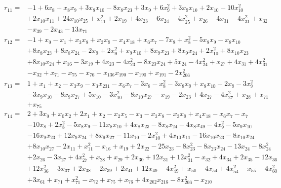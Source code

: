 \[\begin{aligned}
r_{11}={}&-1+6x_{8}+x_{8}x_{9}+3x_{8}x_{10}-8x_{8}x_{23}+3x_{9}+6x_{9}^{2}+3x_{9}x_{10}+2x_{10}-10x_{10}^{2}
\\ &+2x_{10}x_{11}+24x_{10}x_{25}+x_{11}^{2}+2x_{19}+4x_{23}-6x_{24}-4x_{25}^{2}+x_{26}-4x_{31}-4x_{31}^{2}+x_{32}
\\ &-x_{39}-2x_{43}-13x_{71}
\end{aligned}\]
\[\begin{aligned}
r_{12}={}&-1+x_{0}-x_{1}+x_{3}x_{8}+x_{3}x_{9}-x_{4}x_{18}+x_{6}x_{7}-7x_{8}+x_{8}^{2}-5x_{8}x_{9}-x_{8}x_{10}
\\ &+8x_{8}x_{23}+8x_{8}x_{24}-2x_{9}+2x_{9}^{2}+x_{9}x_{10}+8x_{9}x_{23}+8x_{9}x_{24}+2x_{10}^{2}+8x_{10}x_{23}
\\ &+8x_{10}x_{24}+x_{16}-3x_{19}+4x_{23}-4x_{23}^{2}-8x_{23}x_{24}+5x_{24}-4x_{24}^{2}+x_{27}+4x_{31}+4x_{31}^{2}
\\ &-x_{32}+x_{71}-x_{75}-x_{76}-x_{136}x_{190}-x_{190}+x_{191}-2x_{206}^{2}
\end{aligned}\]
\[\begin{aligned}
r_{13}={}&1+x_{1}+x_{2}-x_{3}x_{9}-x_{3}x_{231}-x_{6}x_{7}-3x_{8}-x_{8}^{2}-3x_{8}x_{9}+x_{8}x_{10}+2x_{9}-3x_{9}^{2}
\\ &-3x_{9}x_{10}-8x_{9}x_{27}+5x_{10}-3x_{10}^{2}-8x_{10}x_{27}-x_{19}-2x_{23}+4x_{27}-4x_{27}^{2}+x_{28}+x_{71}
\\ &+x_{75}
\end{aligned}\]
\[\begin{aligned}
r_{14}={}&2+3x_{0}+x_{0}x_{2}+2x_{1}+x_{2}-x_{2}x_{5}-x_{3}-x_{3}x_{8}-x_{3}x_{9}+x_{4}x_{18}-x_{6}x_{7}-x_{7}
\\ &-10x_{8}+2x_{8}^{2}-5x_{8}x_{9}-11x_{8}x_{10}+4x_{8}x_{23}-8x_{8}x_{24}-4x_{8}x_{49}-4x_{9}^{2}-5x_{9}x_{10}
\\ &-16x_{9}x_{23}+12x_{9}x_{24}+8x_{9}x_{27}-11x_{10}-2x_{10}^{2}+4x_{10}x_{11}-16x_{10}x_{23}-8x_{10}x_{24}
\\ &+8x_{10}x_{27}-2x_{11}+x_{11}^{2}-x_{16}+x_{19}+2x_{22}-25x_{23}-8x_{23}^{2}-8x_{23}x_{24}-13x_{24}-8x_{24}^{2}
\\ &+2x_{26}-3x_{27}+4x_{27}^{2}+x_{28}+x_{29}+2x_{30}+12x_{31}+12x_{31}^{2}-x_{32}+4x_{34}+2x_{35}-12x_{36}
\\ &+12x_{36}^{2}-3x_{37}+2x_{38}-2x_{39}+2x_{41}+12x_{49}-4x_{49}^{2}+x_{50}-4x_{54}+4x_{54}^{2}-x_{55}-4x_{60}^{2}
\\ &+3x_{61}+x_{71}+x_{71}^{2}-x_{72}+x_{75}+x_{76}+4x_{202}x_{216}-8x_{206}^{2}-x_{210}
\end{aligned}\]
